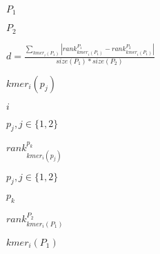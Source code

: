 \documentclass{article}
\begin{document}
$P_1$
\pagebreak

$P_2$
\pagebreak

$d = \frac{ \sum_{kmer_i(P_1)} | rank_{kmer_i(P_1)}^{P_1} - 
rank_{kmer_i(P_1)}^{P_2} | }{size(P_1) * size(P_2) }$
\pagebreak

$kmer_i(p_j)$
\pagebreak

$i$
\pagebreak

$p_j, 
j \in \{1, 2\}$
\pagebreak

$rank_{kmer_i(p_j)}^{p_k}$
\pagebreak

$p_j, j \in \{1, 2\}$
\pagebreak

$p_k$
\pagebreak

$rank_{kmer_i(P_1)}^{P_2}$
\pagebreak

$kmer_i(P_1)$
\pagebreak
\end{document}
